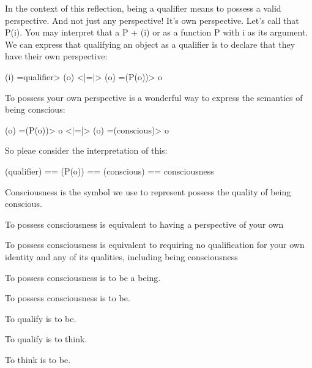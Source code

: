 \documentclass[runningheads]{llncs}
\begin{document}
In the context of this reflection, being a qualifier means to possess a valid perspective. And not just any perspective! It's own perspective. Let's call that P(i). You may interpret that a P + (i) or as a function P with i as its argument. We can express that qualifying an object as a qualifier is to declare that they have their own perspective:

(i) =qualifier> (o) <|=|> (o) =(P(o))> o

To possess your own perspective is a wonderful way to express the semantics of being conscious:

(o) =(P(o))> o <|=|> (o) =(conscious)> o

So pleae consider the interpretation of this:

(qualifier) == (P(o)) == (conscious) == consciousness

\setcounter{definition}{1}
\begin{assertion}
Consciousness is the symbol we use to represent possess the quality of being conscious.
\end{assertion}

\setcounter{definition}{1}
\begin{assertion}
To possess consciousness is equivalent to having a perspective of your own
\end{assertion}

\setcounter{definition}{1}
\begin{assertion}
To possess consciousness is equivalent to requiring no qualification for your own identity and any of its qualities, including being consciousness
\end{assertion}

\setcounter{definition}{1}
\begin{assertion}
To possess consciousness is to be a being.
\end{assertion}

\setcounter{definition}{1}
\begin{assertion}
To possess consciousness is to be.
\end{assertion}

\setcounter{definition}{1}
\begin{assertion}
To qualify is to be.
\end{assertion}

\setcounter{definition}{1}
\begin{assertion}
To qualify is to think.
\end{assertion}

\setcounter{definition}{1}
\begin{assertion}
To think is to be.
\end{assertion}
\end{document}
